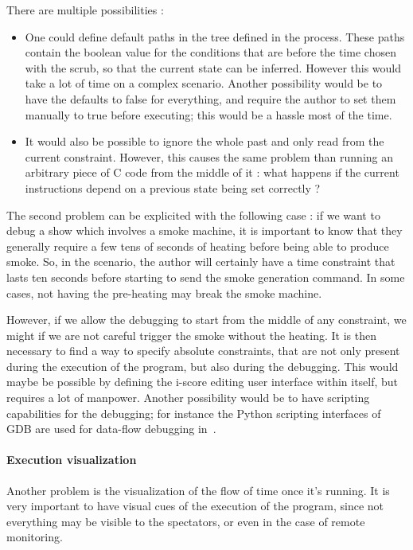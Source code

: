 \documentclass{sigchi}
\begin{document}
There are multiple possibilities : 

\begin{itemize}
    \item One could define default paths in the tree defined in the process. These paths contain the boolean value for the conditions that are before the time chosen with the scrub, so that the current state can be inferred. However this would take a lot of time on a complex scenario.
    Another possibility would be to have the defaults to false for everything, and require the author to set them manually to true before executing; this would be a hassle most of the time.
    \item It would also be possible to ignore the whole past and only read from the current constraint. However, this causes the same problem than running an arbitrary piece of C code from the middle of it : what happens if the current instructions depend on a previous state being set correctly ?
\end{itemize}

The second problem can be explicited with the following case : if we want to debug a show which involves a smoke machine, it is important to know that they generally require a few tens of seconds of heating before being able to produce smoke. So, in the scenario, the author will certainly have a time constraint that lasts ten seconds before starting to send the smoke generation command. In some cases, not having the pre-heating may break the smoke machine.

However, if we allow the debugging to start from the middle of any constraint, we might if we are not careful trigger the smoke without the heating. It is then necessary to find a way to specify absolute constraints, that are not only present during the execution of the program, but also during the debugging. This would maybe be possible by defining the i-score editing user interface within itself, but requires a lot of manpower. Another possibility would be to have scripting capabilities for the debugging; for instance the Python scripting interfaces of GDB are used for data-flow debugging in~\cite{pouget2013interactive}.

\paragraph{Execution visualization}
Another problem is the visualization of the flow of time once it's running. It is very important to have visual cues of the execution of the program, since not everything may be visible to the spectators, or even in the case of remote monitoring.
\end{document}
